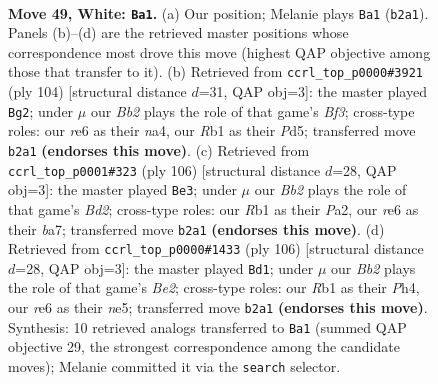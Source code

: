 \documentclass[11pt]{article}
\begin{document}
\clearpage

\begin{figure}[p]\centering
\begin{subfigure}{0.46\textwidth}\centering
\resizebox{\linewidth}{!}{%
\newchessgame
\chessboard[
  setfen={7k/3n4/4r3/8/p1p3P1/P1P4p/1BP2K1P/1R6 w - - 3 49},
  showmover=false,
  pgfstyle=straightmove, color=movearrow, markmove={b2-a1}
]}
\caption{}
\end{subfigure}\hfill
\begin{subfigure}{0.46\textwidth}\centering
\resizebox{\linewidth}{!}{%
\newchessgame
\chessboard[
  setfen={8/5k2/3p2p1/3Pp1P1/n1p1P3/5B2/P2K4/8 w - - 9 53},
  showmover=false,
  pgfstyle=straightmove, color=movearrow, markmove={f3-g2}
]}
\caption{}
\end{subfigure}
\\[4pt]
\begin{subfigure}{0.46\textwidth}\centering
\resizebox{\linewidth}{!}{%
\newchessgame
\chessboard[
  setfen={8/b7/p6p/1p1k1p1P/5P2/1P1K4/P2B4/8 w - - 16 54},
  showmover=false,
  pgfstyle=straightmove, color=movearrow, markmove={d2-e3}
]}
\caption{}
\end{subfigure}\hfill
\begin{subfigure}{0.46\textwidth}\centering
\resizebox{\linewidth}{!}{%
\newchessgame
\chessboard[
  setfen={8/p5k1/Pp6/4np2/3p3P/6P1/1PK1B3/8 w - - 17 54},
  showmover=false,
  pgfstyle=straightmove, color=movearrow, markmove={e2-d1}
]}
\caption{}
\end{subfigure}
\caption{\textbf{Move 49, White: \texttt{Ba1}.} (a) Our position; Melanie plays \texttt{Ba1} (\texttt{b2a1}). Panels (b)--(d) are the retrieved master positions whose correspondence most drove this move (highest QAP objective among those that transfer to it). (b) Retrieved from \texttt{ccrl\_top\_p0000\#3921} (ply 104) [structural distance $d$=31, QAP obj=3]: the master played \texttt{Bg2}; under $\mu$ our \emph{Bb2} plays the role of that game's \emph{Bf3}; cross-type roles: our \emph{r}e6 as their \emph{n}a4, our \emph{R}b1 as their \emph{P}d5; transferred move \texttt{b2a1} \textbf{(endorses this move)}. (c) Retrieved from \texttt{ccrl\_top\_p0001\#323} (ply 106) [structural distance $d$=28, QAP obj=3]: the master played \texttt{Be3}; under $\mu$ our \emph{Bb2} plays the role of that game's \emph{Bd2}; cross-type roles: our \emph{R}b1 as their \emph{P}a2, our \emph{r}e6 as their \emph{b}a7; transferred move \texttt{b2a1} \textbf{(endorses this move)}. (d) Retrieved from \texttt{ccrl\_top\_p0000\#1433} (ply 106) [structural distance $d$=28, QAP obj=3]: the master played \texttt{Bd1}; under $\mu$ our \emph{Bb2} plays the role of that game's \emph{Be2}; cross-type roles: our \emph{R}b1 as their \emph{P}h4, our \emph{r}e6 as their \emph{n}e5; transferred move \texttt{b2a1} \textbf{(endorses this move)}. Synthesis: 10 retrieved analogs transferred to \texttt{Ba1} (summed QAP objective 29, the strongest correspondence among the candidate moves); Melanie committed it via the \texttt{search} selector.}
\label{fig:thought-m96}
\end{figure}
\end{document}
